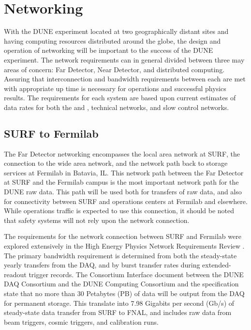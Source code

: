 \documentclass[../main-v1.tex]{subfiles}
\begin{document}
\chapter{Networking }
\label{ch:netw}






With the DUNE experiment located at two geographically distant sites and having computing resources distributed around the globe, the design and operation of networking will be important to the success of the DUNE experiment. The network requirements can in general divided between three may areas of concern: Far Detector, Near Detector, and distributed computing. Assuring that interconnection and bandwidth requirements between each are met with appropriate up time is necessary for operations and successful physics results. The requirements for each system are based upon current estimates of data rates for both the  and  , technical networks, and slow control networks.

\section{SURF to Fermilab}

The Far Detector networking encompasses the local area network at SURF, the connection to the wide area network, and the network path back to storage services at Fermilab in Batavia, IL. This network path between the Far Detector at SURF and the Fermilab campus is the most important network path for the DUNE raw data. This path will be used both for transfers of raw data, and also for connectivity between SURF and operations centers at Fermilab and elsewhere. While operations traffic is expected to use this connection, it should be noted that safety systems will not rely upon the network connection.

The requirements for the network connection between SURF and Fermilab were explored extensively in the High Energy Physics Network Requirements Review\cite{bib:osti_1804717} . The primary bandwidth requirement is determined from both the steady-state yearly transfers from the DAQ, and by burst transfer rates during extended-readout trigger records. The Consortium Interface document between the DUNE DAQ Consortium and the DUNE Computing Consortium and the  specification \cite{edms:dunedaq} state that no more than 30 Petabytes (PB) of data will be output from the DAQ for permanent storage. This translate into 7.98 Gigabits per second (Gb/s) of steady-state data transfer from SURF to FNAL, and includes raw data from beam triggers, cosmic triggers, and calibration runs. 
\end{document}
